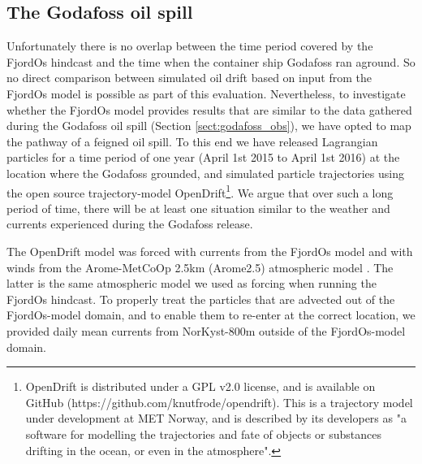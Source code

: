 \subsection{The Godafoss oil spill}
\label{sect:godafoss_model}
Unfortunately there is no overlap between the time period covered by the FjordOs hindcast and the time when the container ship Godafoss ran aground. So no direct comparison between simulated oil drift based on input from the FjordOs model is possible as part of this evaluation. Nevertheless, to investigate whether the FjordOs model provides results that are similar to the data gathered during the Godafoss oil spill (Section \ref{sect:godafoss_obs}), we have opted to map the pathway of a feigned oil spill. To this end we have released Lagrangian particles for a time period of one year (April 1st 2015 to April 1st 2016) at the location where the Godafoss grounded, and simulated particle trajectories using the open source trajectory-model OpenDrift\footnote{OpenDrift is distributed under a GPL v2.0 license, and is available on GitHub (https://github.com/knutfrode/opendrift). This is a trajectory model under development at MET Norway, and is described by its developers as "a software for modelling the trajectories and fate of objects or substances drifting in the ocean, or even in the atmosphere".}. We argue that over such a long period of time, there will be at least one situation similar to the weather and currents experienced during the Godafoss release.

The OpenDrift model was forced with currents from the FjordOs model and with winds from the Arome-MetCoOp 2.5km (Arome2.5) atmospheric model \citep{mulle:etal:2017}. The latter is the same atmospheric model we used as forcing when running the FjordOs hindcast. To properly treat the particles that are advected out of the FjordOs-model domain, and to enable them to re-enter at the correct location, we provided daily mean currents from NorKyst-800m outside of the FjordOs-model domain. 

